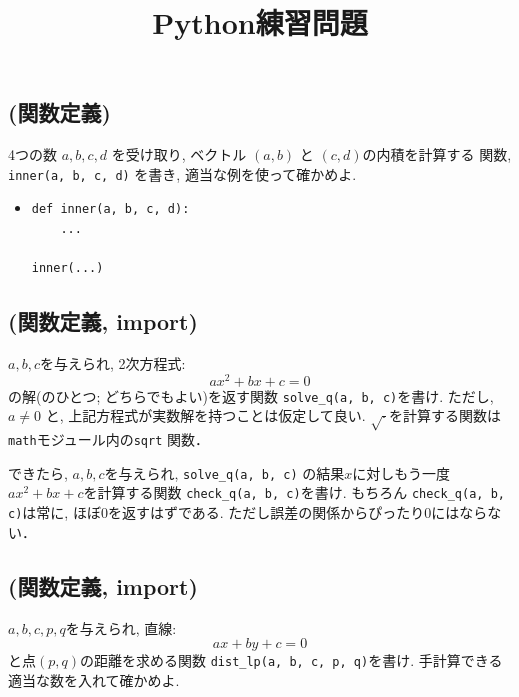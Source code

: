\documentclass[10pt,dvipdfmx]{article}
\title{Python練習問題}
\author{}
\date{}
\begin{document}
\maketitle

\section{}

\subsection{{\scriptsize (関数定義)}}
4つの数 $a, b, c, d$ を受け取り, ベクトル $(a, b)$ と $(c, d)$の内積を計算する
関数, {\tt inner(a, b, c, d)} を書き, 適当な例を使って確かめよ.

\begin{itemize}
\item []
\begin{lstlisting}
def inner(a, b, c, d):
    ...

inner(...)
\end{lstlisting}
\end{itemize}

\iffalse
\subsection{{\scriptsize (関数定義, import)}}
$a, b, c$を与えられ, 2次方程式:
\[ ax^2 + bx + c = 0 \]
の解(のひとつ; どちらでもよい)を返す関数
{\tt solve\_q(a, b, c)}を書け. ただし, $a \neq 0$
と, 上記方程式が実数解を持つことは仮定して良い.
$\sqrt{\cdot}$を計算する関数は{\tt math}モジュール内の{\tt sqrt}
関数．

できたら, $a, b, c$を与えられ, {\tt solve\_q(a, b, c)}
の結果$x$に対しもう一度$ax^2 + bx + c$を計算する関数
{\tt check\_q(a, b, c)}を書け. もちろん
{\tt check\_q(a, b, c)}は常に, ほぼ0を返すはずである.
ただし誤差の関係からぴったり0にはならない．

\subsection{{\scriptsize (関数定義, import)}}
$a, b, c, p, q$を与えられ, 直線:
\[ ax + by + c = 0 \]
と点$(p, q)$の距離を求める関数
{\tt dist\_lp(a, b, c, p, q)}を書け. 
手計算できる適当な数を入れて確かめよ.

\end{document}
